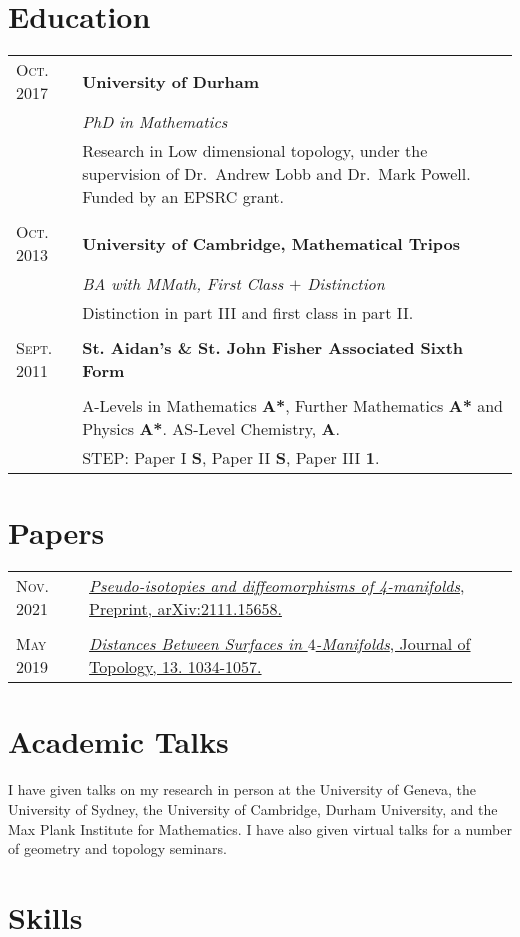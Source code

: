 \documentclass[a4paper]{article}
\makeatletter
\newcommand{\tablebreak}{\multicolumn{2}{c}{} \\}
\newlength{\datelength}
\newenvironment{datejobtable}{\begin{tabular}{@{} >{\raggedleft}p{\datelength} | p{\linewidth- \datelength - 2\tabcolsep - \arrayrulewidth} @{}}}{\end{tabular}}
\newcommand{\job}[5][]{

\textsc{#2} \ifthenelse{\equal{#3}{}}{}{to}  & \textbf{#4}\\
\ifthenelse{\equal{#3}{Present}}{Present}{\textsc{#3}}\ifthenelse{\equal{#1}{}}{}{&\textit{#1}\\}&\small #5\\
}
\newcommand{\paper}[4][]{
\textsc{#2} & \href{#1}{\textit{#3},  #4.}\\
}
\newcommand{\arxivpaper}[4][]{
\paper[https://arxiv.org/abs/#4]{#2}{#3}{Preprint, arXiv:#4\ifthenelse{\equal{#1}{}}{}{, #1}}
}
\makeatother
\begin{document}
\section*{Education}
\begin{datejobtable}

\job[PhD in Mathematics]{Oct. 2017}{Jun. 2022}{University of Durham}{Research in Low dimensional topology, under the supervision of Dr.~Andrew Lobb and Dr.~Mark Powell. Funded by an EPSRC grant.}

\tablebreak

\job[BA with MMath, First Class $+$ Distinction]{Oct. 2013}{Jun. 2017}{University of Cambridge, Mathematical Tripos}{Distinction in part III and first class in part II. }

\tablebreak

\job{Sept. 2011}{Jul. 2013}{St. Aidan's \& St. John Fisher Associated Sixth Form}{A-Levels in Mathematics \textbf{A*}, Further Mathematics \textbf{A*} and Physics \textbf{A*}. \small AS-Level Chemistry, \textbf{A}. \\ &\small STEP: Paper I \textbf{S}, Paper II \textbf{S}, Paper III \textbf{1}.}

\end{datejobtable}

\section*{Papers}

\begin{datejobtable}

\arxivpaper{Nov. 2021}{Pseudo-isotopies and diffeomorphisms of 4-manifolds}{2111.15658}
\tablebreak
\paper[https://arxiv.org/abs/1905.00763]{May 2019}{Distances Between Surfaces in $4$-Manifolds}{Journal of Topology, 13. 1034-1057}

\end{datejobtable} 


\section*{Academic Talks}

I have given talks on my research in person at the University of Geneva, the University of Sydney, the University of Cambridge, Durham University, and the Max Plank Institute for Mathematics. I have also given virtual talks for a number of geometry and topology seminars.

\section*{Skills}
\end{document}

